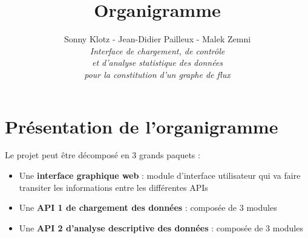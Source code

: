 
\geometry{top=3cm,bottom=3cm}
\usepackage{bbding}

\title{\vspace{\fill}\textbf{\Huge Organigramme}}
\author{Sonny Klotz - Jean-Didier Pailleux - Malek Zemni\vspace{2em}\\\textit{Interface de chargement, de contrôle}\\\textit{et d’analyse statistique des données}\\\textit{pour la constitution d’un graphe de flux}\vspace{2em}}


\clearpage
\maketitle\vspace{\fill}
\newpage\clearpage{}
	
	\section{Présentation de l'organigramme}
		Le projet peut être décomposé en 3 grands paquets :
		\begin{itemize}
		\item Une \textbf{interface graphique web} : module d'interface utilisateur qui va faire transiter les informations entre les différentes APIs
		\item Une \textbf{API 1 de chargement des données} : composée de 3 modules
		\item Une \textbf{API 2 d'analyse descriptive des données} : composée de 3 modules
		\end{itemize}
		
